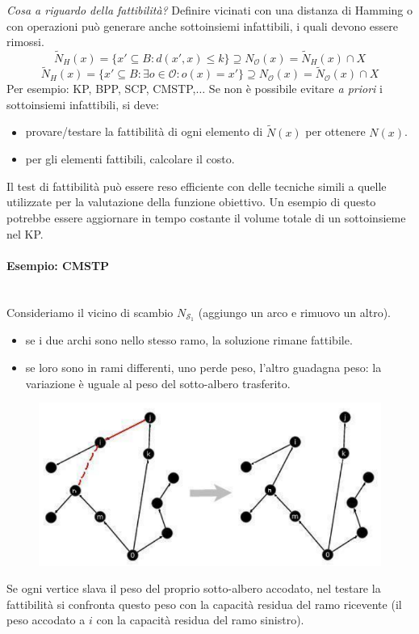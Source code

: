 \documentclass{article}
\begin{document}
\textit{Cosa a riguardo della fattibilità?} Definire vicinati con una distanza di Hamming o con operazioni
può generare anche sottoinsiemi infattibili, i quali devono essere rimossi.
$$\tilde{N}_H(x)=\{x'\subseteq B: d(x',x)\leq k\}\supseteq N_{\mathcal{O}}(x)=\tilde{N}_H(x)\cap X$$
$$\tilde{N}_H(x)=\{x'\subseteq B:\exists o \in \mathcal{O}:o(x)=x'\}\supseteq N_{\mathcal{O}}(x)=\tilde{N}_{\mathcal{O}}(x)\cap X$$
Per esempio: KP, BPP, SCP, CMSTP,$\dots$
Se non è possibile evitare \textit{a priori} i sottoinsiemi infattibili, si deve:
\begin{itemize}
    \item provare/testare la fattibilità di ogni elemento di $\tilde{N}(x)$ per ottenere $N(x)$.
    \item per gli elementi fattibili, calcolare il costo.
\end{itemize}
Il test di fattibilità può essere reso efficiente con delle tecniche simili a quelle utilizzate
per la valutazione della funzione obiettivo. Un esempio di questo potrebbe essere aggiornare
in tempo costante il volume totale di un sottoinsieme nel KP.

\paragraph{Esempio: CMSTP}\mbox{}\\
Consideriamo il vicino di scambio $N_{\mathcal{S}_1}$ (aggiungo un arco e rimuovo un altro).
\begin{itemize}
    \item se i due archi sono nello stesso ramo, la soluzione rimane fattibile.
    \item se loro sono in rami differenti, uno perde peso, l'altro guadagna peso: la variazione
    è uguale al peso del sotto-albero trasferito.
\end{itemize}
\begin{figure}[H]
    \centering
    \includegraphics[scale=0.6]{images/lez14_4.png}
\end{figure}
Se ogni vertice slava il peso del proprio sotto-albero accodato, nel testare la fattibilità
si confronta questo peso con la capacità residua del ramo ricevente (il peso accodato
a $i$ con la capacità residua del ramo sinistro).
\end{document}
